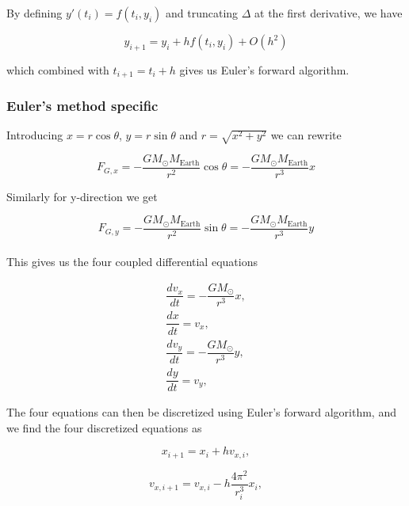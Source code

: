 \documentclass[a4paper, fontsize=11pt]{article}
\begin{document}
By defining $y'(t_{i})=f(t_{i}, y_{i})$ and truncating $\Delta$ at the first derivative, we have 

\begin{equation}
y_{i+1}=y_{i} + h f(t_{i},y_{i}) + O(h^2)
\end{equation}

which combined with $t_{i+1}=t_{i}+h$ gives us Euler's forward algorithm. \cite{H-Jensen}

\subsubsection{Euler's method specific}
Introducing $x = r \cos \theta$, $y=r \sin \theta$ and $r=\sqrt{x^2+y^2}$ we can rewrite 

\begin{equation}
F_{G,x}=-\dfrac{GM_{\odot} M_{\text{Earth}}}{r^2} \cos \theta = - \dfrac{G M_{\odot} M_{\text{Earth}}}{r^3} x
\end{equation}

Similarly for y-direction we get

\begin{equation}
F_{G,y}=-\dfrac{GM_{\odot} M_{\text{Earth}}}{r^2} \sin \theta = - \dfrac{G M_{\odot} M_{\text{Earth}}}{r^3} y
\end{equation}
 

\paragraph{}
This gives us the four coupled differential equations 

\begin{align}
\dfrac{dv_{x}}{dt}=-\dfrac{G M_{\odot}}{r^3}x, \\
\dfrac{dx}{dt} = v_{x}, \\
\dfrac{dv_{y}}{dt}=-\dfrac{G M_{\odot}}{r^3}y, \\
\dfrac{dy}{dt} = v_{y},
\end{align}


The four equations can then be discretized using Euler's forward algorithm, and we find the four discretized equations as

\begin{equation}
x_{i+1} = x_{i} + h v_{x,i},
\end{equation}

\begin{equation}
v_{x,i+1} = v_{x,i} - h \dfrac{4 \pi^2}{r_{i}^3}x_{i},
\end{equation}
\end{document}
